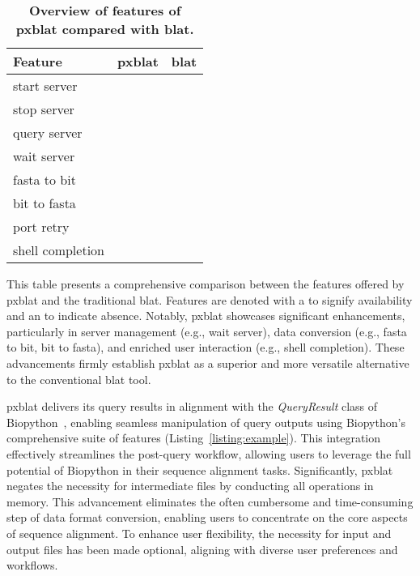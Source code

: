 \documentclass[10pt,letterpaper]{article}
\newcommand{\cmark}{\ding{51}}%
\newcommand{\xmark}{\ding{55}}%
\begin{document}
\begin{table}[!ht]
	\centering
	\caption{{\bf Overview of features of \gls{pxblat} compared with \gls{blat}.}}\label{tab:apicmp}
	\begin{tabular}{@{}lll@{}}
		\toprule
		Feature          & \gls{pxblat} & \gls{blat} \\ \midrule
		start server     & \cmark{}     & \cmark{}   \\
		stop  server     & \cmark{}     & \cmark{}   \\
		query server     & \cmark{}     & \cmark{}   \\
		wait server      & \cmark{}     & \xmark{}   \\
		fasta to bit     & \cmark{}     & \xmark{}   \\
		bit to fasta     & \cmark{}     & \xmark{}   \\
		port retry       & \cmark{}     & \xmark{}   \\
		shell completion & \cmark{}     & \xmark{}   \\
		\bottomrule
	\end{tabular}
	\begin{flushleft}
        This table presents a comprehensive comparison between the features offered by \gls{pxblat} and the traditional \gls{blat}.
        Features are denoted with a \cmark{} to signify availability and an \xmark{} to indicate absence.
        Notably, \gls{pxblat} showcases significant enhancements, particularly in server management (e.g., wait server), data conversion (e.g., fasta to bit, bit to fasta), and enriched user interaction (e.g., shell completion).
        These advancements firmly establish \gls{pxblat} as a superior and more versatile alternative to the conventional \gls{blat} tool.
	\end{flushleft}
\end{table}

\gls{pxblat} delivers its query results in alignment with the \emph{QueryResult} class of Biopython~\cite{cock2009biopython}, enabling seamless manipulation of query outputs using Biopython's comprehensive suite of features (Listing~\ref{listing:example}).
This integration effectively streamlines the post-query workflow, allowing users to leverage the full potential of Biopython in their sequence alignment tasks.
Significantly, \gls{pxblat} negates the necessity for intermediate files by conducting all operations in memory.
This advancement eliminates the often cumbersome and time-consuming step of data format conversion, enabling users to concentrate on the core aspects of sequence alignment.
To enhance user flexibility, the necessity for input and output files has been made optional, aligning with diverse user preferences and workflows.
\end{document}
